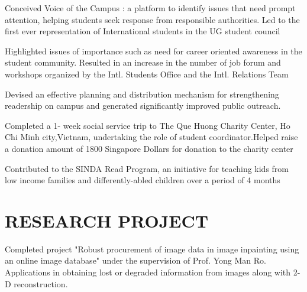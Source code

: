 \documentclass[]{deedy-resume-openfont}
\begin{document}
\begin{minipage}[t]{0.66\textwidth}
\begin{tightemize} 
\item Conceived Voice of the Campus :  a platform to identify issues that need prompt attention, helping students seek response from responsible authorities. Led to the first ever representation of International students in the UG student council 
\item Highlighted issues of importance such as need for career oriented awareness in the student community. Resulted in an increase in the number of job forum and workshops organized by the Intl. Students Office and the Intl. Relations Team
\item Devised an effective planning and distribution mechanism for strengthening readership on campus and generated significantly improved public outreach. 
\end{tightemize}

\begin{tightemize} 
\item Completed a 1- week social service trip to The Que Huong Charity Center, Ho Chi Minh city,Vietnam, undertaking the role of student coordinator.Helped raise a donation amount of 1800 Singapore Dollars for donation to the charity center 
\item Contributed to the SINDA Read Program, an initiative for teaching kids from low income families and differently-abled children over a period of 4 months 
\end{tightemize}


\section{RESEARCH PROJECT}
Completed project "Robust procurement of image data in image inpainting using an online image database" under the supervision of Prof. Yong Man Ro. Applications in obtaining lost or degraded information from images along with 2-D reconstruction.


\end{minipage}
\end{document}
